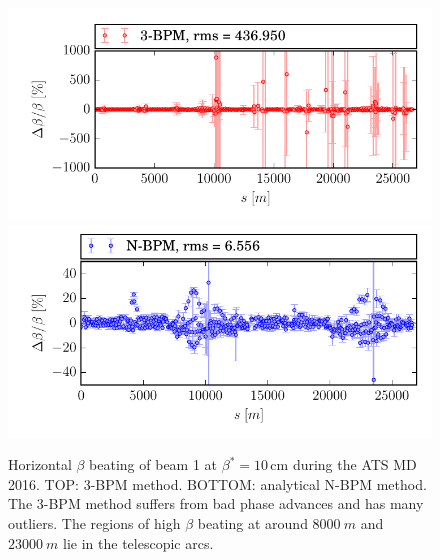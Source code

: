 \begin{figure}
	\centering
  \includegraphics[width=\linewidth]{10cm_b1_x_3bpm}
    \includegraphics[width=\linewidth]{10cm_b1_x_nbpm}
	\caption{Horizontal $ \beta $ beating of beam 1 at $ \beta^*=10\,\text{cm} $ during the ATS MD 2016. TOP: 3-BPM method. BOTTOM: analytical N-BPM method. The 3-BPM method suffers from bad phase advances and has many outliers. The regions of high $ \beta $ beating at around $ \SI{8000}{m} $ and $ \SI{23000}{m} $ lie in the telescopic arcs. }
	\label{fig:10cm_beam1_hor_3bpm}
\end{figure}



